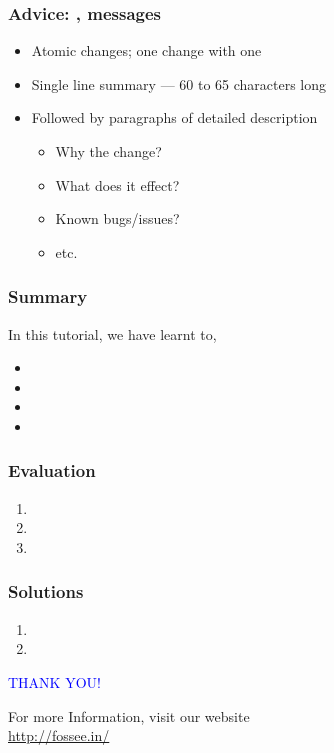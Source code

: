 \documentclass[14pt,compress]{beamer}
\begin{document}
\begin{frame}
  \frametitle{\alert{Advice}: , messages}
  \begin{itemize}
  \item Atomic changes; one change with one 
  \item Single line summary --- 60 to 65 characters long
  \item Followed by paragraphs of detailed description
    \begin{itemize}
    \item Why the change?
    \item What does it effect?
    \item Known bugs/issues?
    \item etc. 
    \end{itemize}
  \end{itemize}
\end{frame}

\begin{frame}
\frametitle{Summary}
\label{sec-8}

  In this tutorial, we have learnt to,


\begin{itemize}
\item 
\item 
\item 
\item 
\end{itemize}
\end{frame}
\begin{frame}[fragile]
\frametitle{Evaluation}
\label{sec-9}


\begin{enumerate}
\item 
\item 
\item 
\end{enumerate}
\end{frame}
\begin{frame}
\frametitle{Solutions}
\label{sec-10}


\begin{enumerate}
\item 
\vspace{15pt}
\item 
\end{enumerate}
\end{frame}
\begin{frame}

\begin{block}{}
  \begin{center}
  \textcolor{blue}{\Large THANK YOU!} 
  \end{center}
  \end{block}
\begin{block}{}
  \begin{center}
    For more Information, visit our website\\
    \url{http://fossee.in/}
  \end{center}  
  \end{block}
\end{frame}
\end{document}
